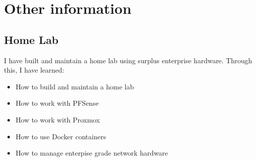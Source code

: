 \documentclass[letterpaper]{twentysecondcv} %
\begin{document}

\section{Other information}

\subsection{Home Lab}

I have built and maintain a home lab using surplus enterprise hardware.  Through this, I have learned:
\begin{itemize}
	\item How to build and maintain a home lab
	\item How to work with PFSense
	\item How to work with Proxmox
	\item How to use Docker containers
	\item How to manage enterpise grade network hardware
\end{itemize}






\end{document}
